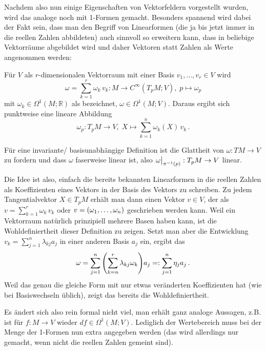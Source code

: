 \documentclass[../H_Analysis_main.tex]{subfiles}
\begin{document}
Nachdem also nun einige Eigenschaften von Vektorfeldern vorgestellt wurden, wird das analoge noch mit 1-Formen gemacht. Besonders spannend wird dabei der Fakt sein, dass man den Begriff von Linearformen (die ja bis jetzt immer in die reellen Zahlen abbildeten) auch sinnvoll so erweitern kann, dass in beliebige Vektorräume abgebildet wird und daher Vektoren statt Zahlen als Werte angenommen werden:
\begin{defi}
Für $V$ als $r$-dimensionalen Vektorraum mit einer Basis $v_1, \dots, v_r \in V$ wird
\begin{equation}
\omega = \sum_{k = 1}^r \omega_k \, v_k: M \rightarrow C^\infty(T_p M; V), \; p \mapsto \omega_p
\end{equation}
mit $\omega_k \in \Omega^1(M; \mathbb{R})$ als  bezeichnet, $\omega \in \Omega^1(M; V)$. Daraus ergibt sich punktweise eine lineare Abbildung
\begin{equation}
\omega_p: T_p M \rightarrow V, \; X \mapsto \sum_{k = 1}^n \omega_k(X) \, v_k \, .
\end{equation}

Für eine invariante/ basisunabhängige Definition ist die Glattheit von $\omega: TM \rightarrow V$ zu fordern und dass $\omega$ faserweise linear ist, also  $\eval{\omega}_{\pi^{-1}(p)}: T_p M \rightarrow V$ linear.
\end{defi}

Die Idee ist also, einfach die bereits bekannten Linearformen in die reellen Zahlen als Koeffizienten eines Vektors in der Basis des Vektors zu schreiben. Zu jedem Tangentialvektor $X \in T_p M$ erhält man dann einen Vektor $v \in V$, der als $v = \sum_{k = 1}^r \omega_k \, v_k$ oder $v = \qty(\omega_1, \dots, \omega_n)$ geschrieben werden kann. Weil ein Vektorraum natürlich prinzipiell mehrere Basen haben kann, ist die Wohldefiniertheit dieser Definition zu zeigen. Setzt man aber die Entwicklung $v_k = \sum_{j = 1}^n \lambda_{kj} a_j$ in einer anderen Basis $a_j$ ein, ergibt das
\begin{equation}
\omega = \sum_{j = 1}^n \qty(\sum_{k = n}^r \lambda_{kj} \omega_k) a_j =: \sum_{j = 1}^n \eta_j a_j \, .
\end{equation}
Weil das genau die gleiche Form mit nur etwas veränderten Koeffizienten hat (wie bei Basiswechseln üblich), zeigt das bereits die Wohldefiniertheit.

Es ändert sich also rein formal nicht viel, man erhält ganz analoge Aussagen, z.B. ist für $f: M \rightarrow V$ wieder $df \in \Omega^1(M; V)$. Lediglich der Wertebereich muss bei der Menge der 1-Formen nun extra angegeben werden (das wird allerdings nur gemacht, wenn nicht die reellen Zahlen gemeint sind).
\end{document}
